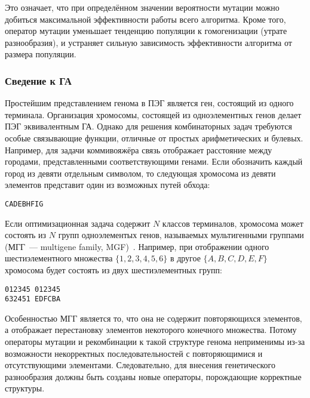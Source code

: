 Это означает, что при определённом значении вероятности мутации можно добиться максимальной эффективности работы всего алгоритма. Кроме того, оператор мутации уменьшает тенденцию популяции к гомогенизации (утрате разнообразия), и устраняет сильную зависимость эффективности алгоритма от размера популяции.


\subsubsection{Сведение к ГА}

Простейшим представлением генома в ПЭГ является ген, состоящий из одного терминала. Организация хромосомы, состоящей из одноэлементных генов делает ПЭГ эквивалентным ГА. Однако для решения комбинаторных задач требуются особые связывающие функции, отличные от простых арифметических и булевых. Например, для задачи коммивояжёра связь отображает расстояние между городами, представленными соответствующими генами. Если обозначить каждый город из девяти отдельным символом, то следующая хромосома из девяти элементов представит один из возможных путей обхода:

\begin{verbatim}
CADEBHFIG
\end{verbatim}

Если оптимизационная задача содержит $N$ классов терминалов, хромосома может состоять из $N$ групп одноэлементых генов, называемых мультигенными группами (МГГ~--- multigene family, MGF)~\cite{ferreira:2002:ASIA}. Например, при отображении одного шестиэлементного множества $\{1, 2, 3, 4, 5, 6\}$ в другое $\{A, B, C, D, E, F\}$ хромосома будет состоять из двух шестиэлементных групп:

\begin{samepage}
\begin{verbatim}
012345 012345
632451 EDFCBA
\end{verbatim}
\end{samepage}

Особенностью МГГ является то, что она не содержит повторяющихся элементов, а отображает перестановку элементов некоторого конечного множества. Потому операторы мутации и рекомбинации к такой структуре генома неприменимы из-за возможности некорректных последовательностей с повторяющимися и отсутствующими элементами. Следовательно, для внесения генетического разнообразия должны быть созданы новые операторы, порождающие корректные структуры.

